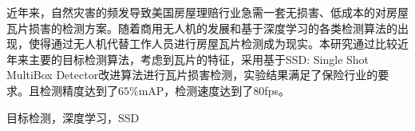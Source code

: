 \begin{uscabstract}
近年来，自然灾害的频发导致美国房屋理赔行业急需一套无损害、低成本的对房屋瓦片损害的检测方案。随着商用无人机的发展和基于深度学习的各类检测算法的出现，使得通过无人机代替工作人员进行房屋瓦片检测成为现实。本研究通过比较近年来主要的目标检测算法，考虑到瓦片的特征，采用基于SSD: Single Shot MultiBox Detector\cite{ssd}改进算法进行瓦片损害检测，实验结果满足了保险行业的要求。且检测精度达到了$65\%$mAP，检测速度达到了80fps。
\end{uscabstract}
\begin{usckeywords}
目标检测，深度学习，SSD
\end{usckeywords}
